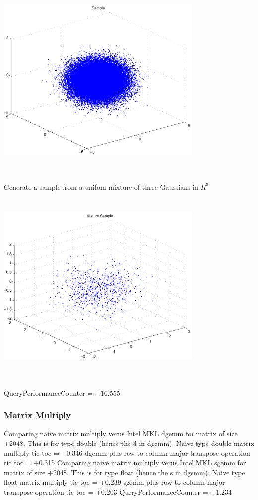 \documentclass[9pt]{article}
\theoremstyle{plain}
\theoremstyle{definition}
\theoremstyle{remark}
\numberwithin{equation}{section}
\begin{document}
\includegraphics[width=10.0cm,height=10.0cm]{R_3_Normal.pdf}

Generate a sample from a unifom mixture of three Gaussians in $R^3$
\includegraphics[width=10.0cm,height=10.0cm]{R_3_Normal_Mixture.pdf}

QueryPerformanceCounter  =  +16.555
\subsubsection{Matrix Multiply}
Comparing naive matrix multiply verus Intel MKL dgemm for matrix of size +2048.
This is for type double (hence the d in dgemm).
Naive type double matrix multiply tic toc  =  +0.346
dgemm plus row to column major transpose operation tic toc  =  +0.315
Comparing naive matrix multiply verus Intel MKL sgemm for matrix of size +2048.
This is for type float (hence the s in dgemm).
Naive type float matrix multiply tic toc  =  +0.239
sgemm plus row to column major transpose operation tic toc  =  +0.203
QueryPerformanceCounter  =  +1.234
\end{document}
